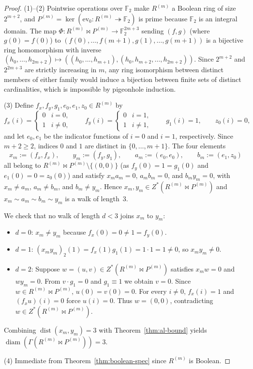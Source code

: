 \documentclass[11pt]{article}
\theoremstyle{definition}
\newcommand{\diam}{\operatorname{diam}}
\newcommand{\dist}{\operatorname{dist}}
\newcommand{\FF}{\mathbb{F}}
\begin{document}
\begin{proof}
(1)--(2) Pointwise operations over $\FF_2$ make $R^{(m)}$ a Boolean ring of size
$2^{m+2}$, and $P^{(m)} = \ker(\mathrm{ev}_0 : R^{(m)} \twoheadrightarrow \FF_2)$ is
prime because $\FF_2$ is an integral domain. The map
$\Phi : R^{(m)} \bowtie P^{(m)} \to \FF_2^{2m+3}$ sending $(f, g)$ (where $g(0) = f(0)$)
to $(f(0), \dots, f(m+1), g(1), \dots, g(m+1))$ is a bijective ring homomorphism with
inverse $(h_0, \dots, h_{2m+2}) \mapsto ((h_0, \dots, h_{m+1}), (h_0, h_{m+2}, \dots, h_{2m+2}))$.
Since $2^{m+2}$ and $2^{2m+3}$ are strictly increasing in $m$, any ring isomorphism
between distinct members of either family would induce a bijection between finite sets of
distinct cardinalities, which is impossible by pigeonhole induction.

(3) Define $f_x, f_y, g_1, e_0, e_1, z_0 \in R^{(m)}$ by
\[
  f_x(i) = \begin{cases} 0 & i = 0, \\ 1 & i \neq 0, \end{cases} \qquad
  f_y(i) = \begin{cases} 0 & i = 1, \\ 1 & i \neq 1, \end{cases} \qquad
  g_1(i) = 1, \qquad z_0(i) = 0,
\]
and let $e_0, e_1$ be the indicator functions of $i = 0$ and $i = 1$, respectively. Since
$m + 2 \ge 2$, indices $0$ and $1$ are distinct in $\{0, \dots, m+1\}$. The four elements
\[
  x_m := (f_x, f_x), \qquad y_m := (f_y, g_1), \qquad
  a_m := (e_0, e_0), \qquad b_m := (e_1, z_0)
\]
all belong to $R^{(m)} \bowtie P^{(m)} \setminus \{(0, 0)\}$ (as $f_y(0) = 1 = g_1(0)$
and $e_1(0) = 0 = z_0(0)$) and satisfy $x_m a_m = 0$, $a_m b_m = 0$, and $b_m y_m = 0$,
with $x_m \neq a_m$, $a_m \neq b_m$, and $b_m \neq y_m$. Hence $x_m, y_m \in Z^*(R^{(m)} \bowtie P^{(m)})$
and $x_m \sim a_m \sim b_m \sim y_m$ is a walk of length~$3$.

We check that no walk of length $d < 3$ joins $x_m$ to $y_m$:
\begin{itemize}
  \item $d = 0$: $x_m \neq y_m$ because $f_x(0) = 0 \neq 1 = f_y(0)$.
  \item $d = 1$: $(x_m y_m)_2(1) = f_x(1) g_1(1) = 1 \cdot 1 = 1 \neq 0$, so $x_m y_m \neq 0$.
  \item $d = 2$: Suppose $w = (u, v) \in Z^*(R^{(m)} \bowtie P^{(m)})$ satisfies
  $x_m w = 0$ and $w y_m = 0$. From $v \cdot g_1 = 0$ and $g_1 \equiv 1$ we obtain
  $v = 0$. Since $w \in R^{(m)} \bowtie P^{(m)}$, $u(0) = v(0) = 0$. For every $i \neq 0$,
  $f_x(i) = 1$ and $(f_x u)(i) = 0$ force $u(i) = 0$. Thus $w = (0, 0)$, contradicting
  $w \in Z^*(R^{(m)} \bowtie P^{(m)})$.
\end{itemize}
Combining $\dist(x_m, y_m) = 3$ with Theorem~\ref{thm:al-bound} yields
$\diam(\Gamma(R^{(m)} \bowtie P^{(m)})) = 3$.

(4) Immediate from Theorem~\ref{thm:boolean-spec} since $R^{(m)}$ is Boolean.
\end{proof}
\end{document}
